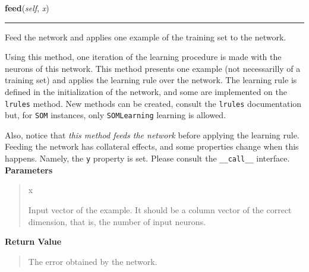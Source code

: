     \vspace{0.5ex}

\hspace{.8\funcindent}\begin{boxedminipage}{\funcwidth}

    \raggedright \textbf{feed}(\textit{self}, \textit{x})

    \vspace{-1.5ex}

    \rule{\textwidth}{0.5\fboxrule}
\setlength{\parskip}{2ex}

Feed the network and applies one example of the training set to the
network.

Using this method, one iteration of the learning procedure is made with
the neurons of this network. This method presents one example (not
necessarilly of a training set) and applies the learning rule over the
network. The learning rule is defined in the initialization of the
network, and some are implemented on the \texttt{lrules} method. New methods
can be created, consult the \texttt{lrules} documentation but, for
\texttt{SOM} instances, only \texttt{SOMLearning} learning is allowed.

Also, notice that \emph{this method feeds the network} before applying the
learning rule. Feeding the network has collateral effects, and some
properties change when this happens. Namely, the \texttt{y} property is set.
Please consult the \texttt{\_\_call\_\_} interface.
\setlength{\parskip}{1ex}
      \textbf{Parameters}
      \vspace{-1ex}

      \begin{quote}
        \begin{Ventry}{x}

          \item[x]


Input vector of the example. It should be a column vector of the
correct dimension, that is, the number of input neurons.
        \end{Ventry}

      \end{quote}

      \textbf{Return Value}
    \vspace{-1ex}

      \begin{quote}

The error obtained by the network.
      \end{quote}

    \end{boxedminipage}

